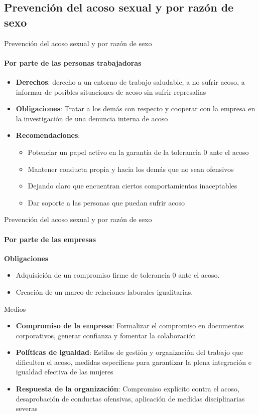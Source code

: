 \documentclass{beamer}
\begin{document}
    \subsection{Prevención del acoso sexual y por razón de sexo}
    \begin{frame}{Prevención del acoso sexual y por razón de sexo}
        \framesubtitle{Por parte de las personas trabajadoras}
        \begin{itemize}
            \item \textbf{Derechos}: derecho a un entorno de trabajo saludable, a no sufrir acoso, a informar de posibles situaciones de acoso sin sufrir represalias
            \item \textbf{Obligaciones}: Tratar a los demás con respecto y cooperar con la empresa en la investigación de una denuncia interna de acoso
            \item \textbf{Recomendaciones}:
            \begin{itemize}
                \item Potenciar un papel activo en la garantía de la tolerancia 0 ante el acoso
                \item Mantener conducta propia y hacia los demás que no sean ofensivos
                \item Dejando claro que encuentran ciertos comportamientos inaceptables
                \item Dar soporte a las personas que puedan sufrir acoso
            \end{itemize}
        \end{itemize}
    \end{frame}
    \begin{frame}{Prevención del acoso sexual y por razón de sexo}
        \framesubtitle{Por parte de las empresas}
        \textbf{Obligaciones}
        \begin{itemize}
            \item Adquisición de un compromiso firme de tolerancia 0 ante el acoso.
            \item Creación de un marco de relaciones laborales igualitarias.
        \end{itemize}
        Medios
        \begin{itemize}
            \item \textbf{Compromiso de la empresa}: Formalizar el compromiso en documentos corporativos, generar confianza y fomentar la colaboración
            \item \textbf{Políticas de igualdad}: Estilos de gestión y organización del trabajo que dificulten el acoso, medidas específicas para garantizar la plena integración e igualdad efectiva de las mujeres
            \item \textbf{Respuesta de la organización}: Compromiso explícito contra el acoso, desaprobación de conductas ofensivas, aplicación de medidas disciplinarias severas
        \end{itemize}
    \end{frame}
\end{document}
